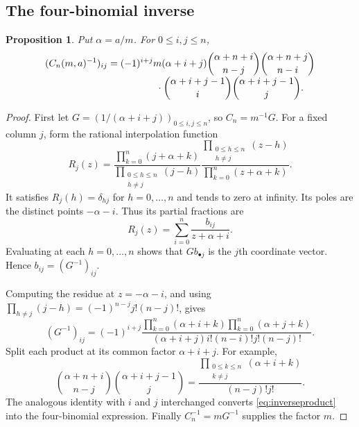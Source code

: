 \documentclass[11pt,a4paper]{article}
\numberwithin{equation}{section}
\newtheorem{proposition}[theorem]{Proposition}
\theoremstyle{definition}
\theoremstyle{remark}
\begin{document}
\subsection{The four-binomial inverse}
\begin{proposition}\label{prop:inverse}
Put $\alpha=a/m$. For $0\leq i,j\leq n$,
\begin{align}
 (C_n(m,a)^{-1})_{ij}
 ={}&(-1)^{i+j}m(\alpha+i+j)
 \binom{\alpha+n+i}{n-j}\binom{\alpha+n+j}{n-i}\notag\\[-1mm]
 &\hspace{13mm}\cdot
 \binom{\alpha+i+j-1}{i}\binom{\alpha+i+j-1}{j}.
 \label{eq:inverse}
\end{align}
\end{proposition}
\begin{proof}
First let $G=(1/(\alpha+i+j))_{0\leq i,j\leq n}$, so $C_n=m^{-1}G$. For a fixed column $j$, form the rational interpolation function
\begin{equation}\label{eq:Rj}
 R_j(z)=
 \frac{\prod_{k=0}^n(j+\alpha+k)}{\prod_{\substack{0\leq h\leq n\\h\neq j}}(j-h)}
 \frac{\prod_{\substack{0\leq h\leq n\\h\neq j}}(z-h)}
 {\prod_{k=0}^n(z+\alpha+k)}.
\end{equation}
It satisfies $R_j(h)=\delta_{hj}$ for $h=0,\ldots,n$ and tends to zero at infinity. Its poles are the distinct points $-\alpha-i$. Thus its partial fractions are
\[
 R_j(z)=\sum_{i=0}^n\frac{b_{ij}}{z+\alpha+i}.
\]
Evaluating at each $h=0,\ldots,n$ shows that $Gb_{\bullet j}$ is the $j$th coordinate vector. Hence $b_{ij}=(G^{-1})_{ij}$.

Computing the residue at $z=-\alpha-i$, and using
$\prod_{h\ne j}(j-h)=(-1)^{n-j}j!(n-j)!$, gives
\begin{equation}\label{eq:inverseproduct}
 (G^{-1})_{ij}
 =(-1)^{i+j}
 \frac{\prod_{k=0}^n(\alpha+i+k)\prod_{k=0}^n(\alpha+j+k)}
 {(\alpha+i+j)i!(n-i)!j!(n-j)!}.
\end{equation}
Split each product at its common factor $\alpha+i+j$. For example,
\[
 \binom{\alpha+n+i}{n-j}\binom{\alpha+i+j-1}{j}
 =\frac{\prod_{\substack{0\leq k\leq n\\k\neq j}}(\alpha+i+k)}{(n-j)!j!}.
\]
The analogous identity with $i$ and $j$ interchanged converts \eqref{eq:inverseproduct} into the four-binomial expression. Finally $C_n^{-1}=mG^{-1}$ supplies the factor $m$.
\end{proof}
\end{document}
